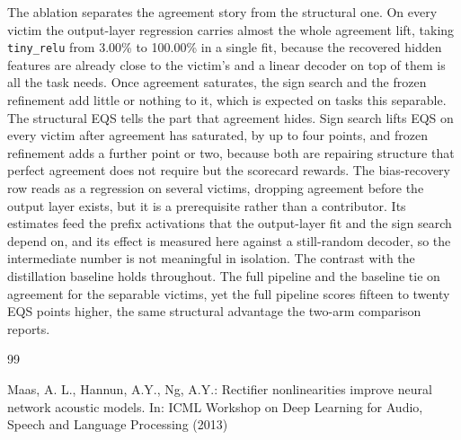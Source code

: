 \documentclass[runningheads,orivec]{llncs}
\begin{document}
The ablation separates the agreement story from the structural one. On every victim
the output-layer regression carries almost the whole agreement lift, taking
\texttt{tiny\_relu} from 3.00\% to 100.00\% in a single fit, because the recovered
hidden features are already close to the victim's and a linear decoder on top of them
is all the task needs. Once agreement saturates, the sign search and the frozen
refinement add little or nothing to it, which is expected on tasks this separable. The
structural EQS tells the part that agreement hides. Sign search lifts EQS on every
victim after agreement has saturated, by up to four points, and frozen refinement adds
a further point or two, because both are repairing structure that perfect agreement
does not require but the scorecard rewards. The bias-recovery row reads as a regression
on several victims, dropping agreement before the output layer exists, but it is a
prerequisite rather than a contributor. Its estimates feed the prefix activations that
the output-layer fit and the sign search depend on, and its effect is measured here
against a still-random decoder, so the intermediate number is not meaningful in
isolation. The contrast with the distillation baseline holds throughout. The full
pipeline and the baseline tie on agreement for the separable victims, yet the full
pipeline scores fifteen to twenty EQS points higher, the same structural advantage the
two-arm comparison reports.

\begin{thebibliography}{99}

Maas, A. L., Hannun, A.Y., Ng, A.Y.: Rectifier nonlinearities improve neural
network acoustic models. In: ICML Workshop on Deep Learning for Audio, Speech
and Language Processing (2013)

\end{thebibliography}
\end{document}
